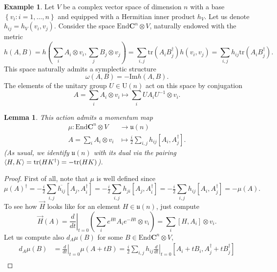 \documentclass[12pt,a4paper]{book}
\newtheorem{lema}[thm]{Lemma}
\theoremstyle{definition} \newtheorem{defn}[thm]{Definition}
\theoremstyle{definition} \newtheorem{ejemplo}[thm]{Example}
\theoremstyle{remark} \newtheorem{rem}[thm]{Remark}
\def\CC{\mathbf{C}}
\def\tr{\mathrm{tr}}
\def\End{\mathrm{End}}
\def\UU{\mathrm{U}}
\def\uu{\mathfrak{u}}
\DeclarePairedDelimiter\esc{\langle}{\rangle}
\begin{document}
    \begin{ejemplo}
      Let $V$ be a complex vector space of dimension $n$ with a base $\left\{ v_i:i=1,\dots,n \right\}$ and equipped with a Hermitian inner product $h_V$. Let us denote $h_{ij}=h_V(v_i,v_j)$. Consider the space $\End \CC^n \otimes V$, naturally endowed with the metric
      \begin{equation*}
	h(A,B)=h\left(\sum_i A_i \otimes v_i, \sum_j B_j \otimes v_j\right)=\sum_{i,j} \tr(A_i B_j^{\dagger}) h(v_i,v_j)=\sum_{i,j}h_{ij}\tr(A_iB_j^{\dagger}).
      \end{equation*}
      This space naturally admits a symplectic structure
      \begin{equation*}
	\omega(A,B)=-\mathrm{Im} h(A,B).
      \end{equation*}
      The elements of the unitary group $U\in\UU(n)$ act on this space by conjugation
      \begin{equation*}
	A=\sum_i A_i \otimes v_i \mapsto \sum_i U A_i U^{-1} \otimes v_i.
      \end{equation*}
    \begin{lema}
      This action admits a momentum map
      \begin{align*}
	\mu :\End \CC^n \otimes V&\longrightarrow \uu(n)\\ 
	A=\sum_i A_i \otimes v_i &\longmapsto \tfrac{i}{2}\sum_{i,j} h_{ij} [A_i,A_j^\dagger].
	\end{align*}
	(As usual, we identify $\uu(n)$ with its dual via the pairing $\esc{H,K}=\tr(HK^\dagger)=-\tr(HK)$).
    \end{lema}
    \begin{proof}
      First of all, note that $\mu$ is well defined since
      \begin{equation*}
	\mu(A)^\dagger=-\tfrac{i}{2} \sum_{i,j} \overline{h_{ij}} [A_j,A_i^\dagger]= -\tfrac{i}{2} \sum_{i,j} h_{ji}[A_j,A_i^\dagger] = -\tfrac{i}{2} \sum_{i,j} h_{ij} [A_i,A_j^\dagger]=-\mu(A). 
      \end{equation*}
      To see how $\vec{H}$ looks like for an element $H\in \uu(n)$, just compute
      \begin{equation*}
	\vec{H}(A)=\left. \frac{d}{dt}\right|_{t=0} \left(\sum_i e^{Ht}A_ie^{-Ht} \otimes v_i\right)= \sum_i [H,A_i] \otimes v_i.
      \end{equation*}
      Let us compute also $d_A\mu(B)$ for some $B\in \End \CC^n\otimes V$,
      \begin{align*}
	d_A\mu(B)&=\left. \frac{d}{dt}\right|_{t=0} \mu(A+tB) = \tfrac{i}{2} \sum_{i,j} h_{ij}\left. \frac{d}{dt}\right|_{t=0} [A_i+tB_i,A_j^\dagger + tB_j^\dagger] \\

\end{align*}
\end{proof}
\end{ejemplo}
\end{document}
